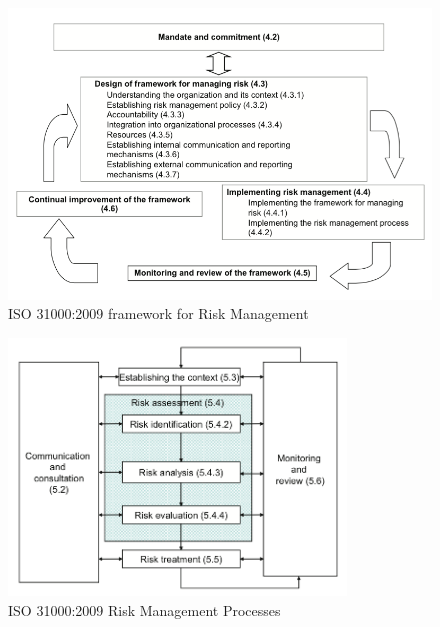 \begin{figure}[h!]
\centering
\includegraphics[width=\textwidth]{img/ISO31000Framework.png}
\caption{ISO 31000:2009 framework for Risk Management}
\end{figure}

\begin{figure}[b!]
\centering
\includegraphics[width=0.8\textwidth]{img/ISO31000RiskProcesses.png}
\caption{ISO 31000:2009 Risk Management Processes}
\end{figure}

